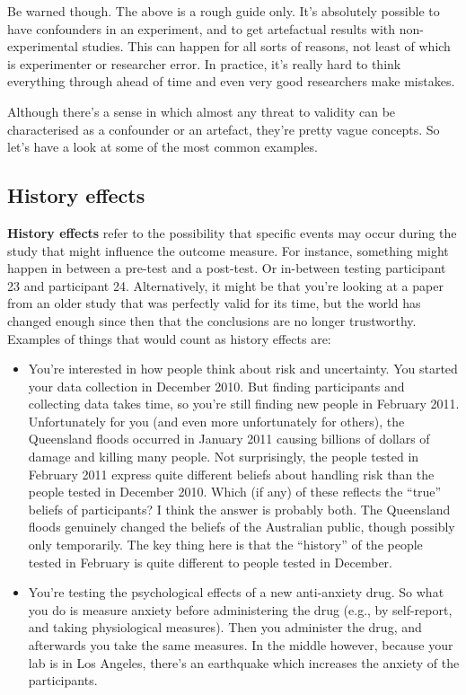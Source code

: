 \documentclass[
]{book}
\providecommand{\tightlist}{%
  \setlength{\itemsep}{0pt}\setlength{\parskip}{0pt}}
\begin{document}
Be warned though. The above is a rough guide only. It's absolutely possible to have confounders in an experiment, and to get artefactual results with non-experimental studies. This can happen for all sorts of reasons, not least of which is experimenter or researcher error. In practice, it's really hard to think everything through ahead of time and even very good researchers make mistakes.

Although there's a sense in which almost any threat to validity can be characterised as a confounder or an artefact, they're pretty vague concepts. So let's have a look at some of the most common examples.

\hypertarget{history-effects}{%
\subsection{History effects}\label{history-effects}}

{\textbf{History effects}} refer to the possibility that specific events may occur during the study that might influence the outcome measure. For instance, something might happen in between a pre-test and a post-test. Or in-between testing participant 23 and participant 24. Alternatively, it might be that you're looking at a paper from an older study that was perfectly valid for its time, but the world has changed enough since then that the conclusions are no longer trustworthy. Examples of things that would count as history effects are:

\begin{itemize}
\tightlist
\item
  You're interested in how people think about risk and uncertainty. You started your data collection in December 2010. But finding participants and collecting data takes time, so you're still finding new people in February 2011. Unfortunately for you (and even more unfortunately for others), the Queensland floods occurred in January 2011 causing billions of dollars of damage and killing many people. Not surprisingly, the people tested in February 2011 express quite different beliefs about handling risk than the people tested in December 2010. Which (if any) of these reflects the ``true'' beliefs of participants? I think the answer is probably both. The Queensland floods genuinely changed the beliefs of the Australian public, though possibly only temporarily. The key thing here is that the ``history'' of the people tested in February is quite different to people tested in December.
\item
  You're testing the psychological effects of a new anti-anxiety drug. So what you do is measure anxiety before administering the drug (e.g., by self-report, and taking physiological measures). Then you administer the drug, and afterwards you take the same measures. In the middle however, because your lab is in Los Angeles, there's an earthquake which increases the anxiety of the participants.
\end{itemize}
\end{document}
